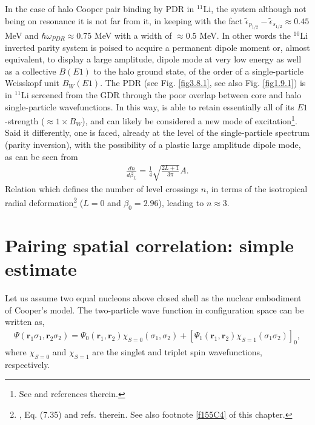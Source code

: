 In the case of halo Cooper pair binding by PDR in $^{11}$Li, the system although not being on resonance it is not far from it, in keeping with the fact $\widetilde\epsilon_{p_{1/2}}-\widetilde\epsilon_{s_{1/2}}\approx 0.45$ MeV and $\hbar\omega_{PDR}\approx0.75$ MeV with a width of $\approx0.5$ MeV. In other words the $^{10}$Li inverted parity system is poised to acquire a permanent dipole moment or, almost equivalent, to display a large amplitude, dipole mode at very low energy as well as a collective $B(E1)$ to the halo ground state, of the order of a single-particle Weisskopf unit $B_{W}(E1)$. The PDR (see Fig. \ref{fig3.8.1}, see also Fig. \ref{fig1.9.1}) is in $^{11}$Li  screened from the GDR through the poor overlap between core and halo single-particle wavefunctions. In this way, is able to retain essentially all of its  $E1$-strength ($\approx1\times B_{W}$), and can likely be considered a new mode of excitation\footnote{See \cite{Broglia:19} and references therein.}. Said it differently, one is faced, already at the level of the single-particle spectrum (parity inversion), with the possibility of a plastic large amplitude dipole mode, as can be seen from  
\begin{align}\label{eq3C6}
\frac{dn}{d\beta_L}=\frac{1}{4}\sqrt{\frac{2L+1}{3\pi}}A.
\end{align}  
Relation which defines the number of level crossings $n$, in terms of the isotropical radial deformation\footnote{\cite{Brink:05}, Eq. (7.35) and refs. therein. See also footnote \ref{f155C4} of this chapter.} ($L=0$ and $\beta_0=2.96$),  leading to $n\approx 3$.
\section{Pairing spatial correlation: simple estimate}\label{app3D}
Let us assume two equal nucleons above closed shell as the nuclear embodiment of Cooper's model. The two-particle wave function in configuration space can be written as,
\begin{align}\label{eq1App3E}
\Psi(\mathbf r_1\sigma_1,\mathbf r_2\sigma_2)=\Psi_0(\mathbf r_1,\mathbf r_2)\chi_{S=0}(\sigma_1,\sigma_2)+\left[\Psi_1(\mathbf r_1,\mathbf r_2)\chi_{S=1}(\sigma_1\sigma_2)\right]_0,
\end{align}
where $\chi_{S=0}$ and $\chi_{S=1}$ are the singlet and triplet spin wavefunctions, respectively.


